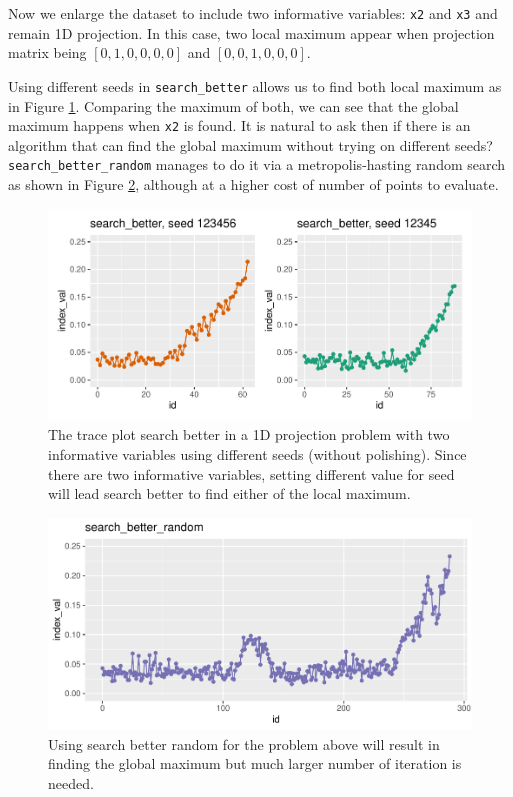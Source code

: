 \documentclass[12pt]{article}
\begin{document}
Now we enlarge the dataset to include two informative variables:
\texttt{x2} and \texttt{x3} and remain 1D projection. In this case, two
local maximum appear when projection matrix being \([0, 1, 0, 0, 0, 0]\)
and \([0, 0, 1 ,0, 0, 0]\).

Using different seeds in \texttt{search\_better} allows us to find both
local maximum as in Figure \ref{1d-2var-different-seeds}. Comparing the
maximum of both, we can see that the global maximum happens when
\texttt{x2} is found. It is natural to ask then if there is an algorithm
that can find the global maximum without trying on different seeds?
\texttt{search\_better\_random} manages to do it via a
metropolis-hasting random search as shown in Figure
\ref{1d-2var-better-random}, although at a higher cost of number of
points to evaluate.

\begin{figure}
\centering
\includegraphics{paper_files/figure-latex/1d-2var-different-seeds-1.pdf}
\caption{\label{1d-2var-different-seeds}The trace plot search better in
a 1D projection problem with two informative variables using different
seeds (without polishing). Since there are two informative variables,
setting different value for seed will lead search better to find either
of the local maximum.}
\end{figure}

\begin{figure}
\centering
\includegraphics{paper_files/figure-latex/1d-2var-better-random-1.pdf}
\caption{\label{1d-2var-better-random}Using search better random for the
problem above will result in finding the global maximum but much larger
number of iteration is needed.}
\end{figure}
\end{document}
